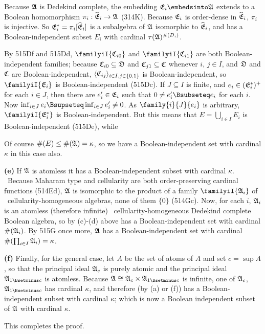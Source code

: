 {Because $\frak A$ is Dedekind complete, the
embedding $\frak E_i\embedsinto\frak A$ extends to a Boolean homomorphism
$\pi_i:\widehat{\frak E}_i\to\frak A$ (314K).
Because $\frak E_i$ is order-dense in $\widehat{\frak E}_i$, 
$\pi_i$ is injective.
So $\frak E_i^*=\pi_i[\widehat{\frak E}_i]$ is a
subalgebra of $\frak A$ isomorphic to $\widehat{\frak E}_i$, and has a
Boolean-independent subset $E_i$ with cardinal $\tau(\frak A)^{\#(D_i)}$.

\medskip

 By 515Df and 515Dd, $\familyiI{\frak C_{i0}}$ and
$\familyiI{\frak C_{i1}}$ are both Boolean-independent families;  because
$\frak C_{i0}\subseteq\frak D$ and $\frak C_{j1}\subseteq\frak C$ whenever
$i$, $j\in I$, and $\frak D$ and $\frak C$ are Boolean-independent,
$\langle\frak C_{ij}\rangle_{i\in I,j\in\{0,1\}}$ is Boolean-independent,
so $\familyiI{\frak E_i}$ is Boolean-independent (515Dc).   If
$J\subseteq I$ is finite, and $e_i\in(\frak E_i^*)^+$ for each
$i\in J$, then there are $e'_i\in\frak E_i$ such that
$0\ne e'_i\Bsubseteq e_i$ for each $i$.   Now
$\inf_{i\in J}e_i\Bsupseteq\inf_{i\in J}e'_i\ne 0$.   As
$\family{i}{J}{e_i}$ is arbitrary, $\familyiI{\frak E^*_i}$ is
Boolean-independent.   But this means that $E=\bigcup_{i\in I}E_i$ is
Boolean-independent (515De), while


\noindent Of course $\#(E)\le\#(\frak A)=\kappa$, so
we have a Boolean-independent set with cardinal $\kappa$ in this case
also.\ \Qed

\medskip

{\bf (e)} If $\frak A$ is atomless it has a Boolean-independent subset
with cardinal $\kappa$.   \Prf\ Because Maharam type and cellularity are
both order-preserving cardinal functions (514Ed), $\frak A$ is
isomorphic to the product of a family $\familyiI{\frak A_i}$ of \Mth\
cellularity-homogeneous algebras, none of them $\{0\}$ (514Gc).
Now, for each $i$, $\frak A_i$ is an atomless (therefore infinite) \Mth\
cellularity-homogeneous Dedekind complete Boolean algebra, so by (c)-(d)
above has a Boolean-independent set with cardinal $\#(\frak A_i)$.   By
515G once more, $\frak A$ has a Boolean-independent set with cardinal
$\#(\prod_{i\in I}\frak A_i)=\kappa$.\ \Qed

\medskip

{\bf (f)} Finally, for the general case, let $A$ be the set of atoms of
$A$ and set $c=\sup A$, so that the principal ideal $\frak A_c$ is
purely atomic and the principal ideal $\frak A_{1\Bsetminus c}$ is
atomless.   Because $\frak A\cong\frak A_c\times\frak A_{1\Bsetminus c}$
is infinite, one of $\frak A_c$, $\frak A_{1\Bsetminus c}$ has cardinal
$\kappa$, and therefore (by (a) or (f)) has a Boolean-independent subset
with cardinal $\kappa$;  which is now a Boolean independent subset of
$\frak A$ with cardinal $\kappa$.

This completes the proof.
}%

